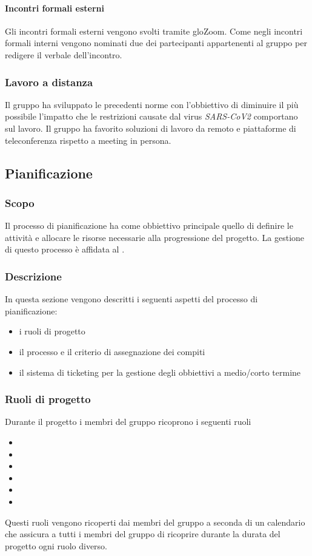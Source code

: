 \paragraph{Incontri formali esterni}
Gli incontri formali esterni vengono svolti tramite glo{Zoom}. Come negli incontri formali interni vengono nominati due dei partecipanti appartenenti al gruppo per redigere il verbale dell'incontro. 

\subsubsection{Lavoro a distanza}
Il gruppo ha sviluppato le precedenti norme con l'obbiettivo di diminuire il più possibile l'impatto che le restrizioni causate dal virus \textit{SARS-CoV2} comportano sul lavoro. Il gruppo ha favorito soluzioni di lavoro da remoto e piattaforme di teleconferenza rispetto a meeting in persona.

\subsection{Pianificazione}
\subsubsection{Scopo}
Il processo di pianificazione ha come obbiettivo principale quello di definire le attività e allocare le risorse necessarie alla progressione del progetto. La gestione di questo processo è affidata al \RdP{}.
\subsubsection{Descrizione}
In questa sezione vengono descritti i seguenti aspetti del processo di pianificazione:
\begin{itemize}
\item i ruoli di progetto
\item il processo e il criterio di assegnazione dei compiti
\item il sistema di ticketing per la gestione degli obbiettivi a medio/corto termine
\end{itemize} 
\subsubsection{Ruoli di progetto}
Durante il progetto i membri del gruppo ricoprono i seguenti ruoli
\begin{itemize}
\item \RdP{}
\item \adm{}
\item \ana{}
\item \prog{}
\item \progr{}
\item \ver{}
\end{itemize}
Questi ruoli vengono ricoperti dai membri del gruppo a seconda di un calendario che assicura a tutti i membri del gruppo di ricoprire durante la durata del progetto ogni ruolo diverso.

